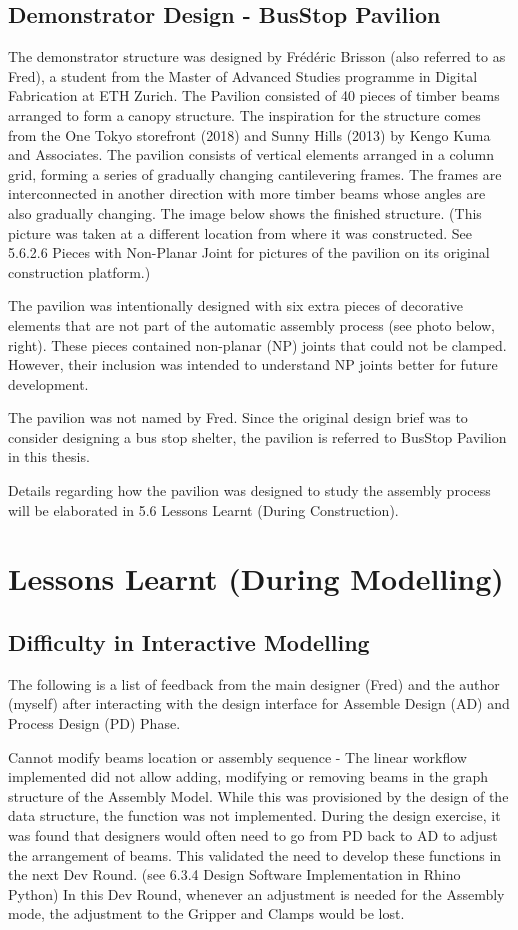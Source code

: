 \begin{itemize}
\begin{enumerate}
\subsection{Demonstrator Design - BusStop Pavilion}
The demonstrator structure was designed by Frédéric Brisson (also referred to as Fred), a student from the Master of Advanced Studies programme in Digital Fabrication at ETH Zurich. The Pavilion consisted of 40 pieces of timber beams arranged to form a canopy structure. 
The inspiration for the structure comes from the One Tokyo storefront (2018) and Sunny Hills (2013) by Kengo Kuma and Associates. The pavilion consists of vertical elements arranged in a column grid, forming a series of gradually changing cantilevering frames. The frames are interconnected in another direction with more timber beams whose angles are also gradually changing.
The image below shows the finished structure. (This picture was taken at a different location from where it was constructed. See 5.6.2.6 Pieces with Non-Planar Joint for pictures of the pavilion on its original construction platform.)

The pavilion was intentionally designed with six extra pieces of decorative elements that are not part of the automatic assembly process (see photo below, right). These pieces contained non-planar (NP) joints that could not be clamped. However, their inclusion was intended to understand NP joints better for future development.
 
The pavilion was not named by Fred. Since the original design brief was to consider designing a bus stop shelter, the pavilion is referred to BusStop Pavilion in this thesis.

Details regarding how the pavilion was designed to study the assembly process will be elaborated in 5.6 Lessons Learnt (During Construction).

\section{Lessons Learnt (During Modelling)}
\subsection{Difficulty in Interactive Modelling}

The following is a list of feedback from the main designer (Fred) and the author (myself) after interacting with the design interface for Assemble Design (AD) and Process Design (PD) Phase.

Cannot modify beams location or assembly sequence - The linear workflow implemented did not allow adding, modifying or removing beams in the graph structure of the Assembly Model. While this was provisioned by the design of the data structure, the function was not implemented. During the design exercise, it was found that designers would often need to go from PD back to AD to adjust the arrangement of beams. This validated the need to develop these functions in the next Dev Round. (see 6.3.4 Design Software Implementation in Rhino Python) In this Dev Round, whenever an adjustment is needed for the Assembly mode, the adjustment to the Gripper and Clamps would be lost.


\end{enumerate}
\end{itemize}
